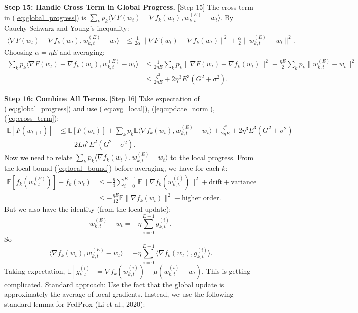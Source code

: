 \documentclass{article}
\begin{document}
\textbf{Step 15: Handle Cross Term in Global Progress.} [Step 15]
The cross term in (\ref{eq:global_progress}) is $\sum_k p_k \langle \nabla F(w_t) - \nabla f_k(w_t), w_{k,t}^{(E)} - w_t \rangle$.
By Cauchy-Schwarz and Young's inequality:
\begin{align}
    \langle \nabla F(w_t) - \nabla f_k(w_t), w_{k,t}^{(E)} - w_t \rangle &\leq \frac{1}{2\alpha} \| \nabla F(w_t) - \nabla f_k(w_t) \|^2 + \frac{\alpha}{2} \| w_{k,t}^{(E)} - w_t \|^2.
\end{align}
Choosing $\alpha = \eta E$ and averaging:
\begin{align}
    \sum_k p_k \langle \nabla F(w_t) - \nabla f_k(w_t), w_{k,t}^{(E)} - w_t \rangle &\leq \frac{1}{2\eta E} \sum_k p_k \| \nabla F(w_t) - \nabla f_k(w_t) \|^2 + \frac{\eta E}{2} \sum_k p_k \| w_{k,t}^{(E)} - w_t \|^2 \\
    &\leq \frac{\zeta^2}{2\eta E} + 2 \eta^3 E^3 (G^2 + \sigma^2). \label{eq:cross_term}
\end{align}

\textbf{Step 16: Combine All Terms.} [Step 16]
Take expectation of (\ref{eq:global_progress}) and use (\ref{eq:avg_local}), (\ref{eq:update_norm}), (\ref{eq:cross_term}):
\begin{align}
    \mathbb{E}[F(w_{t+1})] &\leq \mathbb{E}[F(w_t)] + \sum_k p_k \mathbb{E} \langle \nabla f_k(w_t), w_{k,t}^{(E)} - w_t \rangle + \frac{\zeta^2}{2\eta E} + 2 \eta^3 E^3 (G^2 + \sigma^2) \\
    &\quad + 2 L \eta^2 E^2 (G^2 + \sigma^2).
\end{align}
Now we need to relate $\sum_k p_k \langle \nabla f_k(w_t), w_{k,t}^{(E)} - w_t \rangle$ to the local progress.
From the local bound (\ref{eq:local_bound}) before averaging, we have for each $k$:
\begin{align}
    \mathbb{E}[f_k(w_{k,t}^{(E)})] - f_k(w_t) &\leq - \frac{\eta}{4} \sum_{i=0}^{E-1} \mathbb{E} \| \nabla f_k(w_{k,t}^{(i)}) \|^2 + \text{drift} + \text{variance} \\
    &\leq - \frac{\eta E}{12} \mathbb{E} \| \nabla f_k(w_t) \|^2 + \text{higher order}.
\end{align}
But we also have the identity (from the local update):
\begin{equation}
    w_{k,t}^{(E)} - w_t = - \eta \sum_{i=0}^{E-1} g_{k,t}^{(i)}.
\end{equation}
So
\begin{equation}
    \langle \nabla f_k(w_t), w_{k,t}^{(E)} - w_t \rangle = - \eta \sum_{i=0}^{E-1} \langle \nabla f_k(w_t), g_{k,t}^{(i)} \rangle.
\end{equation}
Taking expectation, $\mathbb{E}[g_{k,t}^{(i)}] = \nabla f_k(w_{k,t}^{(i)}) + \mu (w_{k,t}^{(i)} - w_t)$.
This is getting complicated. Standard approach: Use the fact that the global update is approximately the average of local gradients.
Instead, we use the following standard lemma for FedProx (Li et al., 2020):
\end{document}
